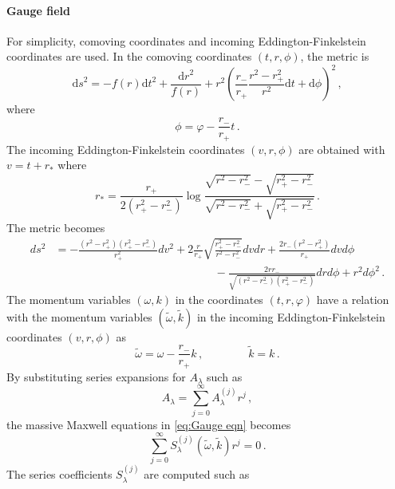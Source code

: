 \documentclass[11pt,a4paper]{article}
\newcommand{\td}{\text{d}}
\begin{document}
\paragraph{Gauge field}
For simplicity, comoving coordinates and incoming Eddington-Finkelstein coordinates are used. In the comoving coordinates $(t,r,\phi)$, the metric is
\begin{equation}
    {\td s}^2 =-f(r) {\td t}^2+\frac{{\td r}^2}{f(r)}+r^2\left(\frac{r_-}{r_+}\frac{r^2-r_+^2}{r^2}\td t + \td \phi\right)^2\,,
\end{equation}
where
\begin{equation}
    \phi=\varphi-\frac{r_-}{r_+}t\,.
\end{equation}
The incoming Eddington-Finkelstein coordinates $(v,r,\phi)$ are obtained with $v=t+r_*$ where
\begin{equation}
    r_*=\frac{r_+}{2(r_+^2-r_-^2)}\log\frac{\sqrt{r^2-r_-^2}-\sqrt{r_+^2-r_-^2}}{\sqrt{r^2-r_-^2}+\sqrt{r_+^2-r_-^2}}\,.
\end{equation}
The metric becomes
\begin{equation} \label{eq:metric incoming E-F}
\begin{split}
    ds^2 &= -\frac{(r^2-r_+^2)(r_+^2-r_-^2)}{r_+^2} dv^2 + 2 \frac{r}{r_+}\sqrt{\frac{r_+^2 - r_-^2}{r^2 - r_-^2}} dv dr +  \frac{2 r_-(r^2 - r_+^2)}{r_+}dv d\phi \\ &\hspace{6cm} - \frac{2 r r_{-}}{\sqrt{(r^2 - r_-^2)(r_+^2 - r_-^2)}}dr d\phi + r^2 d\phi^2\,.
\end{split}
\end{equation}
The momentum variables $(\omega,k)$ in the coordinates $(t,r,\varphi)$ have a relation with the momentum variables $(\tilde{\omega},\tilde{k})$ in the incoming Eddington-Finkelstein coordinates $(v,r,\phi)$ as
\begin{equation} \label{eq:wk To E-F}
    \tilde{\omega}=\omega-\frac{r_-}{r_+}k\,, \qquad \qquad \tilde{k} = k\,.
\end{equation}
By substituting series expansions for $A_\lambda$ such as
\begin{equation}
    A_\lambda = \sum^{\infty}_{j=0}A_\lambda^{(j)} r^j\,,
\end{equation}
the massive Maxwell equations in \eqref{eq:Gauge eqn} becomes
\begin{equation}
    \sum^{
    \infty}_{j=0} S_\lambda^{(j)}(\tilde{\omega}, \tilde{k})r^j =0\,.
\end{equation}
The series coefficients $S_\lambda^{(j)}$ are computed such as
\end{document}
